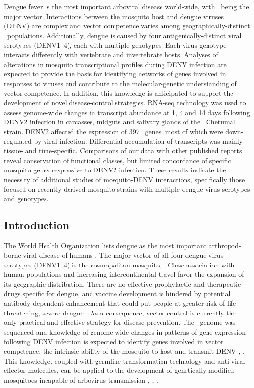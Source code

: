 Dengue fever is the most important arboviral disease world-wide, with \Aea\ being the major vector.
Interactions between the mosquito host and dengue viruses (\gls{DENV}) are complex and vector competence varies among geographically-distinct \Aa\ populations.
Additionally, dengue is caused by four antigenically-distinct viral serotypes (\gls{DENV}1–4), each with multiple genotypes.
Each virus genotype interacts differently with vertebrate and invertebrate hosts.
Analyses of alterations in mosquito transcriptional profiles during \gls{DENV} infection are expected to provide the basis for identifying networks of genes involved in responses to viruses and contribute to the molecular-genetic understanding of vector competence.
In addition, this knowledge is anticipated to support the development of novel disease-control strategies.
RNA-seq technology was used to assess genome-wide changes in transcript abundance at 1, 4 and 14 days following \gls{DENV}2 infection in carcasses, midguts and salivary glands of the \Aa\ Chetumal strain.
\gls{DENV}2 affected the expression of 397 \Aa\ genes, most of which were down-regulated by viral infection.
Differential accumulation of transcripts was mainly tissue- and time-specific.
Comparisons of our data with other published reports reveal conservation of functional classes, but limited concordance of specific mosquito genes responsive to \gls{DENV}2 infection.
These results indicate the necessity of additional studies of mosquito-\gls{DENV} interactions, specifically those focused on recently-derived mosquito strains with multiple dengue virus serotypes and genotypes.


\subsection{Introduction}
The World Health Organization lists dengue as the most important arthropod-borne viral disease of humans \cite{WHO2009}.
The major vector of all four dengue virus serotypes (\gls{DENV}1–4) is the cosmopolitan mosquito, \Aea.
Close association with human populations and increasing intercontinental travel favor the expansion of its geographic distribution.
There are no effective prophylactic and therapeutic drugs specific for dengue, and vaccine development is hindered by potential antibody-dependent enhancement that could put people at greater risk of life-threatening, severe dengue \cite{Gubler2002}.
As a consequence, vector control is currently the only practical and effective strategy for disease prevention.
The \Aa\ genome was sequenced and knowledge of genome-wide changes in patterns of gene expression following \gls{DENV} infection is expected to identify genes involved in vector competence, the intrinsic ability of the mosquito to host and transmit \gls{DENV} \cite{Nene2007}, \cite{Kramer2003}.
This knowledge, coupled with germline transformation technology and anti-viral effector molecules, can be applied to the development of genetically-modified mosquitoes incapable of arbovirus transmission \cite{James2007}, \cite{Franz2006}, \cite{Mathur2010}.

